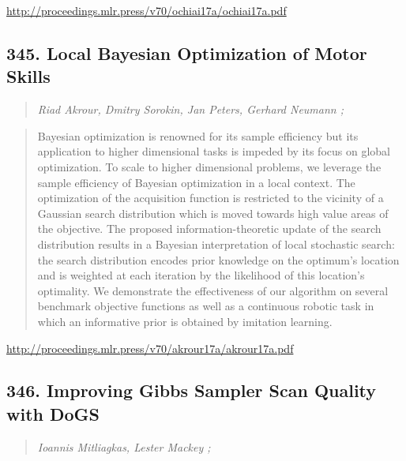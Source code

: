 \documentclass{article}
\begin{document}
\href{http://proceedings.mlr.press/v70/ochiai17a/ochiai17a.pdf}{http://proceedings.mlr.press/v70/ochiai17a/ochiai17a.pdf}

\subsection{345. Local Bayesian Optimization of Motor Skills}

\begin{quote}
\footnotesize{\textit{Riad Akrour, Dmitry Sorokin, Jan Peters, Gerhard Neumann ;}}

\end{quote}

\begin{quote}
    Bayesian optimization is renowned for its sample efficiency but its application to higher dimensional tasks is impeded by its focus on global optimization. To scale to higher dimensional problems, we leverage the sample efficiency of Bayesian optimization in a local context. The optimization of the acquisition function is restricted to the vicinity of a Gaussian search distribution which is moved towards high value areas of the objective. The proposed information-theoretic update of the search distribution results in a Bayesian interpretation of local stochastic search: the search distribution encodes prior knowledge on the optimum’s location and is weighted at each iteration by the likelihood of this location’s optimality. We demonstrate the effectiveness of our algorithm on several benchmark objective functions as well as a continuous robotic task in which an informative prior is obtained by imitation learning.  
\end{quote}

\href{http://proceedings.mlr.press/v70/akrour17a/akrour17a.pdf}{http://proceedings.mlr.press/v70/akrour17a/akrour17a.pdf}

\subsection{346. Improving Gibbs Sampler Scan Quality with DoGS}

\begin{quote}
\footnotesize{\textit{Ioannis Mitliagkas, Lester Mackey ;}}

\end{quote}
\end{document}
